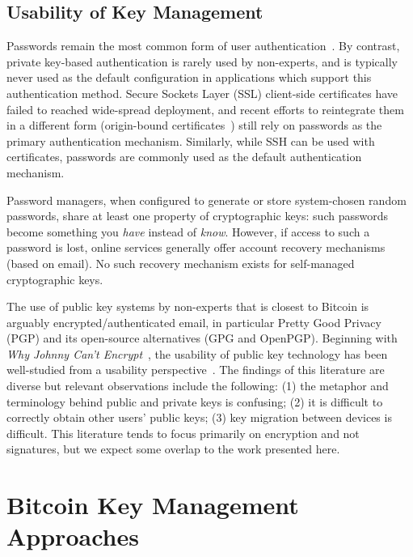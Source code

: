 \subsection{Usability of Key Management}

Passwords remain the most common form of user authentication~\cite{Herley.2012}. By contrast, private key-based authentication is rarely used by non-experts, and is typically never used as the default configuration in applications which support this authentication method. Secure Sockets Layer (SSL) client-side certificates have failed to reached wide-spread deployment, and recent efforts to reintegrate them in a different form (\eg origin-bound certificates~\cite{DCBW12}) still rely on passwords as the primary authentication mechanism. Similarly, while SSH can be used with certificates, passwords are commonly used as the default authentication mechanism.

Password managers, when configured to generate or store system-chosen random passwords, share at least one property of cryptographic keys: such passwords become something you \emph{have} instead of \emph{know}. However, if access to such a password is lost, online services generally offer account recovery mechanisms (\eg based on email). No such recovery mechanism exists for self-managed cryptographic keys.

The use of public key systems by non-experts that is closest to Bitcoin is arguably encrypted/authenticated email, in particular Pretty Good Privacy (PGP) and its open-source alternatives (\ie GPG and OpenPGP). Beginning with \emph{Why Johnny Can't Encrypt}~\cite{WT99}, the usability of public key technology has been well-studied from a usability perspective~\cite{GM05,GMSN+05,SBKH06,GFF06}. The findings of this literature are diverse but relevant observations include the following: (1) the metaphor and terminology behind public and private keys is confusing; (2) it is difficult to correctly obtain other users' public keys; (3) key migration between devices is difficult. This literature tends to focus primarily on encryption and not signatures, but we expect some overlap to the work presented here. 



\section{Bitcoin Key Management Approaches} 
\label{sec:approaches}

